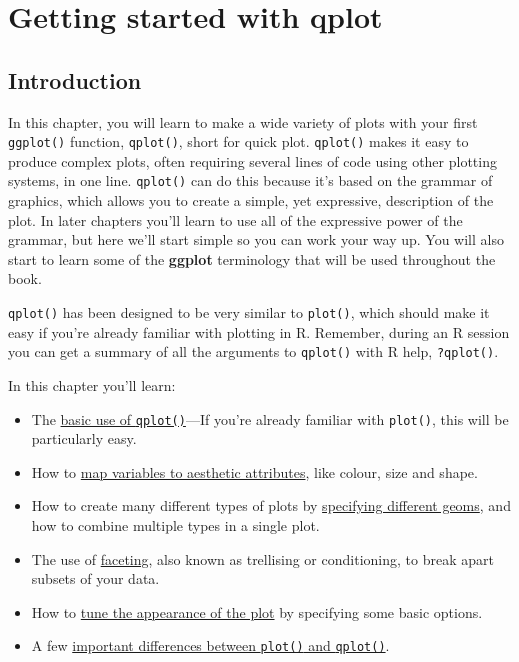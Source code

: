 \chapter{Getting started with qplot}\label{cha:qplot}

\section{Introduction}

In this chapter, you will learn to make a wide variety of plots with
your first \texttt{ggplot()} function, \texttt{qplot()}, short for quick
plot. \texttt{qplot()} makes it easy to produce complex plots, often
requiring several lines of code using other plotting systems, in one
line. \texttt{qplot()} can do this because it's based on the grammar of
graphics, which allows you to create a simple, yet expressive,
description of the plot. In later chapters you'll learn to use all of
the expressive power of the grammar, but here we'll start simple so you
can work your way up. You will also start to learn some of the
\textbf{ggplot} terminology that will be used throughout the book.

\texttt{qplot()} has been designed to be very similar to
\texttt{plot()}, which should make it easy if you're already familiar
with plotting in R. Remember, during an R session you can get a summary
of all the arguments to \texttt{qplot()} with R help, \texttt{?qplot()}.

In this chapter you'll learn:

\begin{itemize}
\itemsep1pt\parskip0pt
\item
  The \hyperref[sec:basic-use]{basic use of \texttt{qplot()}}---If
  you're already familiar with \texttt{plot()}, this will be
  particularly easy.
\item
  How to \hyperref[sec:aesthetic-attributes]{map variables to aesthetic
  attributes}, like colour, size and shape.
\item
  How to create many different types of plots by
  \hyperref[sec:plot-geoms]{specifying different geoms}, and how to
  combine multiple types in a single plot.
\item
  The use of \hyperref[sec:qplot-faceting]{faceting}, also known as
  trellising or conditioning, to break apart subsets of your data.
\item
  How to \hyperref[sec:other-options]{tune the appearance of the plot}
  by specifying some basic options.
\item
  A few \hyperref[sec:plot-diffs]{important differences between
  \texttt{plot()} and \texttt{qplot()}}.
\end{itemize}

